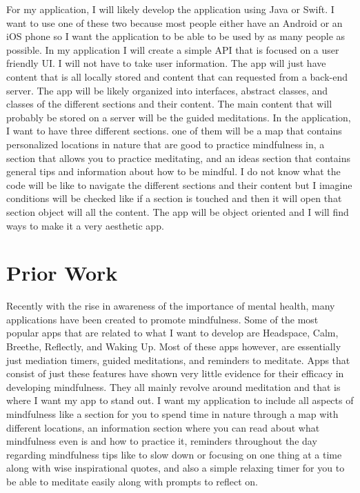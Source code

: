 \documentclass[10pt,twocolumn]{article}
\begin{document}
For my application, I will likely develop the application using Java or Swift. I want to use one of these two because most people either have an Android or an iOS phone so I want the application to be able to be used by as many people as possible. In my application I will create a simple API that is focused on a user friendly UI. I will not have to take user information. The app will just have content that is all locally stored and content that can requested from a back-end server. The app will be likely organized into interfaces, abstract classes, and classes of the different sections and their content. The main content that will probably be stored on a server will be the guided meditations.
In the application, I want to have three different sections. one of them will be a map that contains personalized locations in nature that are good to practice mindfulness in, a section that allows you to practice meditating, and an ideas section that contains general tips and information about how to be mindful. I do not know what the code will be like to navigate the different sections and their content but I imagine conditions will be checked like if a section is touched and then it will open that section object will all the content. The app will be object oriented and I will find ways to make it a very aesthetic app.  

\section{Prior Work}



Recently with the rise in awareness of the importance of mental health, many applications have been created to promote mindfulness. Some of the most popular apps that are related to what I want to develop are Headspace, Calm, Breethe, Reflectly, and Waking Up. Most of these apps however, are essentially just mediation timers, guided meditations, and reminders to meditate. Apps that consist of just these features have shown very little evidence for their efficacy in developing mindfulness. They all mainly revolve around meditation and that is where I want my app to stand out. I want my application to include all aspects of mindfulness like a section for you to spend time in nature through a map with different locations, an information section where you can read about what mindfulness even is and how to practice it, reminders throughout the day regarding mindfulness tips like to slow down or focusing on one thing at a time along with wise inspirational quotes, and also a simple relaxing timer for you to be able to meditate easily along with prompts to reflect on. 
\end{document}
